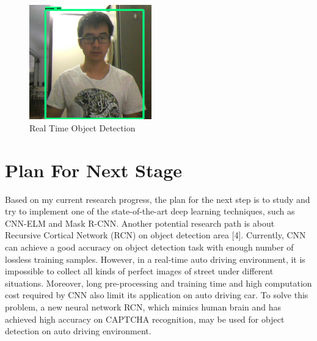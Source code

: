 \documentclass[titlepage]{article}
\begin{document}
\begin{figure}[htbp]
\centering
\includegraphics[width=200]{openCV.png}
\caption{Real Time Object Detection}
\end{figure}
\newpage

\section{Plan For Next Stage}
\label{sec:org87577af}
Based on my current research progress, the plan for the next step is to study
and try to implement one of the state-of-the-art deep learning techniques,
such as CNN-ELM and Mask R-CNN. Another potential research path is about
Recursive Cortical Network (RCN) on object detection area [4]. Currently, CNN
can achieve a good accuracy on object detection task with enough number of
lossless training samples. However, in a real-time auto driving environment,
it is impossible to collect all kinds of perfect images of street under
different situations. Moreover, long pre-processing and training time and high
computation cost required by CNN also limit its application on auto driving
car. To solve this problem, a new neural network RCN, which mimics human brain
and has achieved high accuracy on CAPTCHA recognition, may be used for object
detection on auto driving environment.


\end{document}
